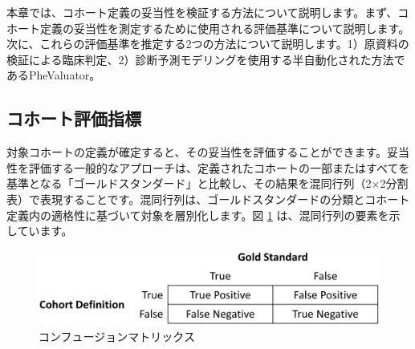 \documentclass[
  11pt]{book}
\theoremstyle{definition}
\theoremstyle{definition}
\theoremstyle{definition}
\theoremstyle{definition}
\theoremstyle{remark}
\begin{document}
本章では、コホート定義の妥当性を検証する方法について説明します。まず、コホート定義の妥当性を測定するために使用される評価基準について説明します。次に、これらの評価基準を推定する2つの方法について説明します。1）原資料の検証による臨床判定、2）診断予測モデリングを使用する半自動化された方法であるPheValuator。

\subsection{コホート評価指標}\label{ux30b3ux30dbux30fcux30c8ux8a55ux4fa1ux6307ux6a19}

対象コホートの定義が確定すると、その妥当性を評価することができます。妥当性を評価する一般的なアプローチは、定義されたコホートの一部またはすべてを基準となる「ゴールドスタンダード」と比較し、その結果を混同行列（2×2分割表）で表現することです。混同行列は、ゴールドスタンダードの分類とコホート定義内の適格性に基づいて対象を層別化します。図 \ref{fig:matrix} は、混同行列の要素を示しています。

\begin{figure}

{\centering \includegraphics[width=0.75\linewidth]{images/ClinicalValidity/matrix} 

}

\caption{コンフュージョンマトリックス}\label{fig:matrix}
\end{figure}
\end{document}

